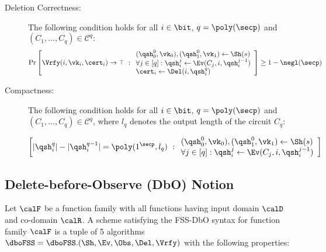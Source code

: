 \begin{description}
\item [Deletion Correctness:] The following condition holds for
all $i \in \bit$, $q = \poly(\secp)$ and $(C_1, \ldots, C_q) \in
\mathcal{C}^q:$
\begin{align}
\Pr\left[
\Vrfy(i, \vk_i, \cert_i) \rightarrow \top
\ :
\begin{array}{ll}
(\qsh_0^0, \vk_0), (\qsh_1^0, \vk_1) \gets \Sh(s)\\
\forall j \in [q]: \qsh_i^j \leftarrow \Ev(C_j, i,
\qsh_i^{j-1})\\
\cert_i \leftarrow \Del(i, \qsh_i^q)
\end{array}
\right] \geq 1 - \negl(\secp)
\end{align}

\item [Compactness:] The following condition holds for all $i \in
\bit$, $q = \poly(\secp)$ and $(C_1, \ldots, C_q) \in
\mathcal{C}^q$, where $l_q$ denotes the output length of the circuit
$C_q$:

\begin{align}
\left[
|\qsh_i^q| - |\qsh_i^{q-1}| = \poly(1^\secp, l_q)
\ :
\begin{array}{ll}
(\qsh_0^0, \vk_0), (\qsh_1^0, \vk_1) \gets \Sh(s)\\
\forall j \in [q]: \qsh_i^j \leftarrow \Ev(C_j, i,
\qsh_i^{j-1})\\
\end{array}
\right]
\end{align}
\end{description}


\subsection{Delete-before-Observe (DbO) Notion}

Let $\calF$ be a function family with all functions having input
domain $\calD$ and co-domain $\calR$. A scheme
satisfying the FSS-DbO syntax for function family $\calF$ is a tuple
of 5 algorithms $\dboFSS = \dboFSS.(\Sh, \Ev, \allowbreak \Obs,
\Del, \Vrfy)$ with the following properties:


